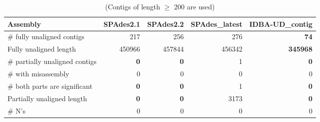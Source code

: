 \documentclass[12pt,a4paper]{article}
\begin{document}
\begin{table}[ht]
\begin{center}
\caption{(Contigs of length $\geq$ 200 are used)}
\begin{tabular}{|l*{4}{|r}|}
\hline
Assembly & SPAdes2.1 & SPAdes2.2 & SPAdes\_latest & IDBA-UD\_contig \\ \hline
\# fully unaligned contigs & 217 & 256 & 276 & {\bf 74} \\ \hline
Fully unaligned length & 450966 & 457844 & 456342 & {\bf 345968} \\ \hline
\# partially unaligned contigs & {\bf 0} & {\bf 0} & 1 & {\bf 0} \\ \hline
    \# with misassembly & 0 & 0 & 0 & 0 \\ \hline
    \# both parts are significant & {\bf 0} & {\bf 0} & 1 & {\bf 0} \\ \hline
Partially unaligned length & {\bf 0} & {\bf 0} & 3173 & {\bf 0} \\ \hline
\# N's & 0 & 0 & 0 & 0 \\ \hline
\end{tabular}
\end{center}
\end{table}
\end{document}
